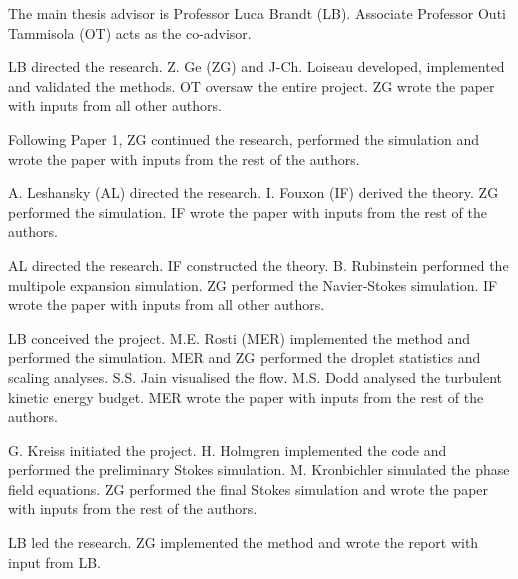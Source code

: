 \begin{divisionofwork}
	The main thesis advisor is Professor Luca Brandt (LB).
	Associate Professor Outi Tammisola (OT) acts as the co-advisor.

        \bigskip

	\paperitem
                LB directed the research.
                Z. Ge (ZG) and J-Ch. Loiseau developed, implemented and validated the methods.
                OT oversaw the entire project.
		ZG wrote the paper with inputs from all other authors.

	\paperitem
                Following Paper 1, ZG continued the research, performed the simulation
                and wrote the paper with inputs from the rest of the authors.

	\paperitem
                A. Leshansky (AL) directed the research.
                I. Fouxon (IF) derived the theory.
		ZG performed the simulation.
                IF wrote the paper with inputs from the rest of the authors.

	\paperitem
                AL directed the research.
                IF constructed the theory.
		B. Rubinstein performed the multipole expansion simulation.
                ZG performed the Navier-Stokes simulation.
                IF wrote the paper with inputs from all other authors.

	\paperitem
                LB conceived the project.
                M.E. Rosti (MER) implemented the method and performed the simulation.
		MER and ZG performed the droplet statistics and scaling analyses.
                S.S. Jain visualised the flow.
                M.S. Dodd analysed the turbulent kinetic energy budget.
                MER wrote the paper with inputs from the rest of the authors.

	\paperitem
                G. Kreiss initiated the project.
                H. Holmgren implemented the code and performed the preliminary Stokes simulation.
                M. Kronbichler simulated the phase field equations.
		ZG performed the final Stokes simulation and 
                wrote the paper with inputs from the rest of the authors.

	\paperitem
                LB led the research.
		ZG implemented the method and wrote the report with input from LB.
               

\end{divisionofwork}


%
%
%


